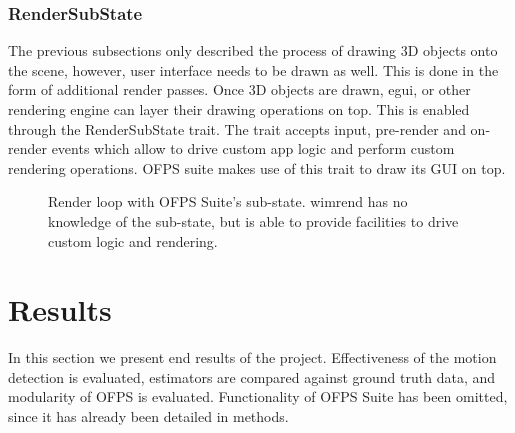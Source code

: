 \documentclass[11pt,english]{report}
\begin{document}
\subsection{RenderSubState}

The previous subsections only described the process of drawing 3D objects onto the scene, however, user interface needs to be drawn as well. This is done in the form of additional render passes. Once 3D objects are drawn, egui, or other rendering engine can layer their drawing operations on top. This is enabled through the RenderSubState trait. The trait accepts input, pre-render and on-render events which allow to drive custom app logic and perform custom rendering operations. OFPS suite makes use of this trait to draw its GUI on top.

\begin{figure}[!ht]
	\centering
	\caption{\centering Render loop with OFPS Suite's sub-state. wimrend has no knowledge of the sub-state, but is able to provide facilities to drive custom logic and rendering.}
\end{figure}


\chapter{Results}

In this section we present end results of the project. Effectiveness of the motion detection is evaluated, estimators are compared against ground truth data, and modularity of OFPS is evaluated. Functionality of OFPS Suite has been omitted, since it has already been detailed in methods.
\end{document}
